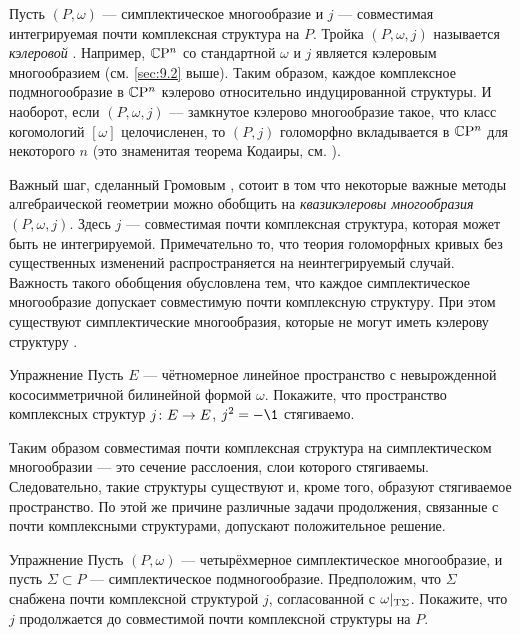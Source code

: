 Пусть $(P, \omega)$ --- симплектическое многообразие и $j$ ---
совместимая интегрируемая почти комплексная структура на $P$.
Тройка $(P, \omega, j)$ называется \emph{кэлеровой}
. 
Например, $\mathbb{C}\mathrm{P}^n$ со стандартной $\omega$ и $j$ является кэлеровым
многообразием (см. \ref{sec:9.2} выше). 
Таким образом, каждое комплексное подмногообразие в $\mathbb{C}\mathrm{P}^n$ кэлерово
относительно индуцированной структуры. 
И наоборот, если $(P, \omega, j)$ --- замкнутое кэлерово многообразие
такое, что класс когомологий $[\omega]$ целочисленен, то $(P, j)$
голоморфно вкладывается в $\mathbb{C}\mathrm{P}^n$ для некоторого $n$ (это знаменитая
теорема Кодаиры, см. \cite{GH}). 

Важный шаг, сделанный Громовым \cite{G1}, сотоит в том что некоторые важные методы алгебраической геометрии можно обобщить на \emph{квазикэлеровы многообразия} $(P, \omega, j)$.
Здесь $j$ --- совместимая почти комплексная структура, которая может быть не интегрируемой.
Примечательно то, что теория голоморфных кривых без существенных изменений распространяется на неинтегрируемый случай.
Важность такого обобщения обусловлена тем, что
каждое симплектическое многообразие допускает совместимую почти комплексную структуру.
При этом существуют симплектические многообразия, которые не могут иметь кэлерову структуру \cite{MS}.

\begin{ex}[\cite{MS}]{Упражнение}\label{10.2.B}
Пусть $E$ --- чётномерное линейное пространство с невырожденной
кососимметричной билинейной формой $\omega$. 
Покажите, что пространство комплексных структур $j\: E \z\to E$, $j^2
= -\1$  стягиваемо. 
\end{ex}

Таким образом совместимая почти комплексная структура на
симплектическом многообразии --- это сечение расслоения, слои которого
стягиваемы. 
Следовательно, такие структуры существуют и, кроме того, образуют
стягиваемое пространство. 
По этой же причине различные задачи продолжения, связанные с почти
комплексными структурами, допускают положительное решение. 

\begin{ex}{Упражнение}\label{10.2.C}
Пусть $(P, \omega)$ --- четырёхмерное симплектическое многообразие, и
пусть $\Sigma \subset P$ --- симплектическое подмногообразие. 
Предположим, что $\Sigma$ снабжена почти комплексной структурой $j$,
согласованной с $\omega|_{\mathrm{T} \Sigma}$. 
Покажите, что $j$ продолжается до совместимой почти комплексной
структуры на $P$. 
\end{ex}


